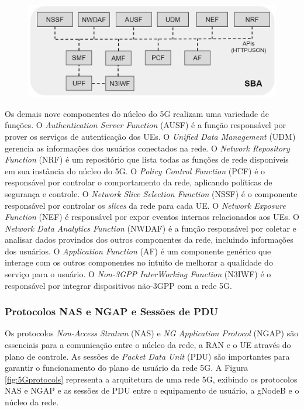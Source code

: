\begin{figure}[!ht]
    \centering
    \includegraphics[width=1\textwidth]{TG1/Images/Core5G.png}
    \label{fig:5Gcore}
\end{figure}

Os demais nove componentes do núcleo do 5G realizam uma variedade de funções.
O \textit{Authentication Server Function} (AUSF) é a função responsável por prover os serviços de autenticação dos UEs.
O \textit{Unified Data Management} (UDM) gerencia as informações dos usuários conectados na rede.
O \textit{Network Repository Function} (NRF) é um repositório que lista todas as funções de rede disponíveis em sua instância do núcleo do 5G.
O \textit{Policy Control Function} (PCF) é o responsável por controlar o comportamento da rede, aplicando políticas de segurança e controle.
O \textit{Network Slice Selection Function} (NSSF) é o componente responsável por controlar os \textit{slices} da rede para cada UE.
O \textit{Network Exposure Function} (NEF) é responsável por expor eventos internos relacionados aos UEs.
O \textit{Network Data Analytics Function} (NWDAF) é a função responsável por coletar e analisar dados provindos dos outros componentes da rede, incluindo informações dos usuários.
O \textit{Application Function} (AF) é um componente genérico que interage com os outros componentes no intuito de melhorar a qualidade do serviço para o usuário.
O \textit{Non-3GPP InterWorking Function} (N3IWF) é o responsável por integrar dispositivos não-3GPP com a rede 5G.

\subsubsection{Protocolos NAS e NGAP e Sessões de PDU}

Os protocolos \textit{Non-Access Stratum} (NAS) e \textit{NG Application Protocol} (NGAP) são essenciais para a comunicação entre o núcleo da rede, a RAN e o UE através do plano de controle.
As sessões de \textit{Packet Data Unit} (PDU) são importantes para garantir o funcionamento do plano de usuário da rede 5G.
A Figura \ref{fig:5Gprotocols} representa a arquitetura de uma rede 5G, exibindo os protocolos NAS e NGAP e as sessões de PDU entre o equipamento de usuário, a gNodeB e o núcleo da rede.

